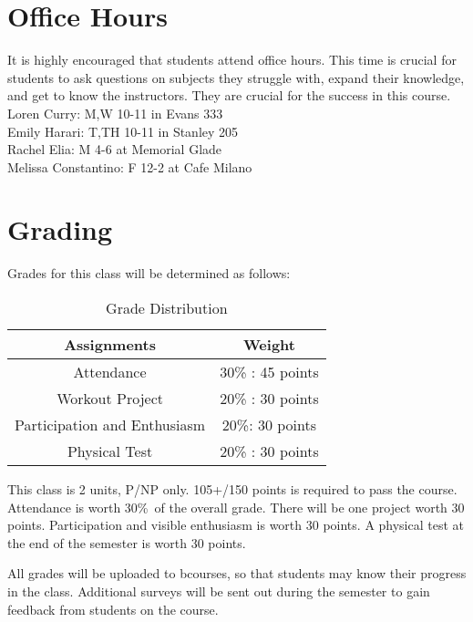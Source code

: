 \documentclass[letterpaper,12pt]{article}
\begin{document}
\section{Office Hours}
It is highly encouraged that students attend office hours. This time is crucial for students to ask questions on subjects they struggle with, expand their knowledge, and get to know the instructors. They are crucial for the success in this course. \\
Loren Curry: M,W 10-11 in Evans 333 \\
Emily Harari: T,TH 10-11 in Stanley 205\\
Rachel Elia: M 4-6 at Memorial Glade\\
Melissa Constantino: F 12-2 at Cafe Milano


\section{Grading}
Grades for this class will be determined as follows:
\begin{table}[ht]
\begin{center}
\caption{Grade Distribution}
\label{tbl:bins} %
\begin{tabular}{|cc|} 
\hline
\multicolumn{1}{|c}{Assignments} & \multicolumn{1}{c|}{Weight} \\
\hline
Attendance &   30\% : 45 points \\
Workout Project &   20\% : 30 points \\
Participation and Enthusiasm &   20\%: 30 points \\
Physical Test &  20\% : 30 points \\
\hline
\end{tabular}
\end{center}
\end{table}

This class is 2 units, P/NP only. 105+/150 points is required to pass the course.   Attendance is worth 30\%\ of the overall grade. There will be one project worth 30 points. Participation and visible enthusiasm is worth 30 points. A physical test at the end of the semester is worth 30 points.

All grades will be uploaded to bcourses, so that students may know their progress in the class. Additional surveys will be sent out during the semester to gain feedback from students on the course.
\end{document}
